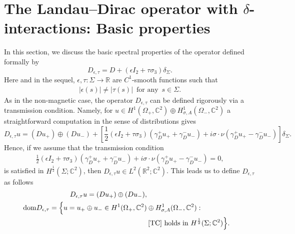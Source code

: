 \documentclass[11pt,a4paper,reqno,oneside]{amsproc}
\DeclareMathOperator{\dom}{dom}
\def \rr {{\mathbb R}}
\def \cc {{\mathbb C}}
\numberwithin{equation}{section}
\def\dom{\mathrm{dom}}
\def \cc {{\mathbb{C}}}
\begin{document}
\section{The Landau--Dirac operator with $\delta$-interactions: Basic properties}\label{secLDD}
In this section, we discuss the basic spectral properties of the operator defined formally by
	\[
	D_{\epsilon, \tau}= D+ (\epsilon I_2 + \tau \sigma_3)\delta_\Sigma.
	\]
    Here and in the sequel, $\epsilon,\tau: \Sigma\to \rr$ are $C^1$-smooth functions such that 
     \begin{align}\label{assumption1}
     |\epsilon(s)|\neq |\tau(s)|\,\,\, \text{for any }\, s\in\Sigma.
     \end{align}
     As in the non-magnetic case, the operator $D_{\epsilon,\tau}$ can be defined rigorously via a transmission condition. Namely, for $u\in H^1(\Omega_+,\cc^2)\oplus H^1_{\sigma, A}(\Omega_-,\cc^2)$ a straightforward computation in the sense of distributions gives 
    \[
    D_{\epsilon,\tau}u= (D u_+)\oplus(D u_-)+ \left[\frac{1}{2}(\epsilon I_2+\tau\sigma_3)(\gamma_D^+u_+ +\gamma_D^-u_-) +i\sigma\cdot\nu(\gamma_D^+u_+-\gamma_D^-u_-)\right]\delta_\Sigma.
    \]
    Hence, if we assume that the transmission condition
\begin{align}\label{TC}
    \frac{1}{2}(\epsilon I_2+\tau\sigma_3)(\gamma_D^+u_+ +\gamma_D^-u_-) +i\sigma\cdot\nu(\gamma_D^+u_+-\gamma_D^-u_-)=0,
 \end{align}
is satisfied in $H^{\frac{1}{2}}(\Sigma;\cc^2)$, then $D_{\epsilon,\tau}u\in L^2(\rr^2;\cc^2)$. This leads us to define $D_{\epsilon,\tau}$ as follows
	\begin{equation} \label{def_A_eta_tau}
		\begin{split}
			D_{\epsilon,\tau}u = (D u_+) \oplus (D u_-), \\
			\dom D_{\epsilon,\tau} = \Big\{ u = u_+ \oplus u_- \in  H^1(\Omega_+,\cc^2)&\oplus H^1_{\sigma, A}(\Omega_-,\cc^2): \\
            &\, \eqref{TC} \text{ holds in } H^{\frac{1}{2}}(\Sigma;\cc^2) \Big\}.
		\end{split}
	\end{equation}
\end{document}
